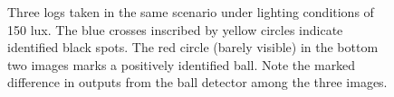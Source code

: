 \documentclass[11pt, twocolumn]{article}
\begin{document}
\begin{figure}
\caption{Three logs taken in the same scenario under lighting conditions of 150 lux. The blue crosses inscribed by yellow circles indicate identified black spots. The red circle (barely visible) in the bottom two images marks a positively identified ball. Note the marked difference in outputs from the ball detector among the three images.}
\end{figure}
\end{document}
